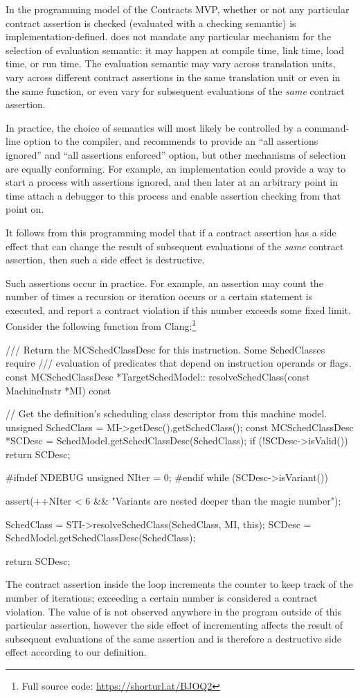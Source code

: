 In the programming model of the Contracts MVP, whether or not any particular contract assertion is checked (evaluated with a checking semantic) is implementation-defined. \cite{P2900R6} does not mandate any particular mechanism for the selection of evaluation semantic: it may happen at compile time, link time, load time, or run time. The evaluation semantic may vary across translation units, vary across different contract assertions in the same translation unit or even in the same function, or even vary for subsequent evaluations of the \emph{same} contract assertion.

In practice, the choice of semantics will most likely be controlled by a command-line option to the compiler, and \cite{P2900R6} recommends to provide an ``all assertions ignored'' and ``all assertions enforced'' option, but other mechanisms of selection are equally conforming. For example, an implementation could provide a way to start a process with assertions ignored, and then later at an arbitrary point in time attach a debugger to this process and enable assertion checking from that point on. 

It follows from this programming model that if a contract assertion has a side effect that can change the result of subsequent evaluations of the \emph{same} contract assertion, then such a side effect is destructive.

Such assertions occur in practice. For example, an assertion may count the number of times a recursion or iteration occurs or a certain statement is executed, and report a contract violation if this number exceeds some fixed limit. Consider the following function from Clang:\footnote{Full source code: \url{https://shorturl.at/BJOQ2}}
\begin{codeblock}
/// Return the MCSchedClassDesc for this instruction. Some SchedClasses require
/// evaluation of predicates that depend on instruction operands or flags.
const MCSchedClassDesc *TargetSchedModel::
resolveSchedClass(const MachineInstr *MI) const {

  // Get the definition's scheduling class descriptor from this machine model.
  unsigned SchedClass = MI->getDesc().getSchedClass();
  const MCSchedClassDesc *SCDesc = SchedModel.getSchedClassDesc(SchedClass);
  if (!SCDesc->isValid())
    return SCDesc;

#ifndef NDEBUG
  unsigned NIter = 0;
#endif
  while (SCDesc->isVariant()) {
    assert(++NIter < 6 && "Variants are nested deeper than the magic number");

    SchedClass = STI->resolveSchedClass(SchedClass, MI, this);
    SCDesc = SchedModel.getSchedClassDesc(SchedClass);
  }
  return SCDesc;
}
\end{codeblock}
The contract assertion inside the  loop increments the counter  to keep track of the number of iterations; exceeding a certain number is considered a contract violation. The value of  is not observed anywhere in the program outside of this particular assertion, however the side effect of incrementing  affects the result of subsequent evaluations of the same assertion and is therefore a destructive side effect according to our definition.

